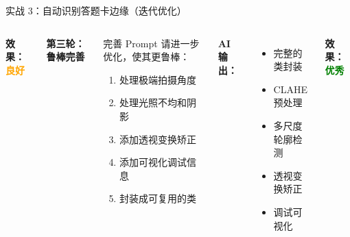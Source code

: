 \begin{frame}{实战 3：自动识别答题卡边缘（迭代优化）}
\begin{columns}
		\textbf{效果：}\textcolor{orange}{\textbf{良好}}

		\textbf{第三轮：鲁棒完善}

		\begin{exampleblock}{完善 Prompt}
			\small
			请进一步优化，使其更鲁棒：
			\begin{enumerate}
				\item 处理极端拍摄角度
				\item 处理光照不均和阴影
				\item 添加透视变换矫正
				\item 添加可视化调试信息
				\item 封装成可复用的类
			\end{enumerate}
		\end{exampleblock}

		\vspace{0.2cm}

		\textbf{AI 输出：}
		\begin{itemize}
			\item 完整的类封装
			\item CLAHE 预处理
			\item 多尺度轮廓检测
			\item 透视变换矫正
			\item 调试可视化
		\end{itemize}

		\textbf{效果：}\textcolor{green}{\textbf{优秀}}
	\end{columns}
\end{frame}



